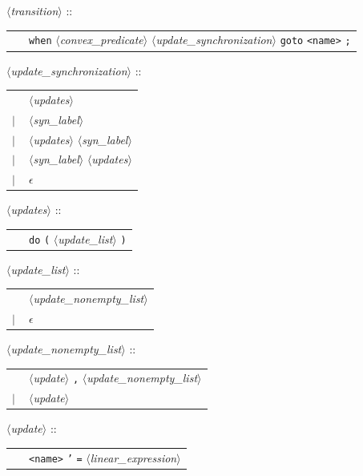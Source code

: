 \documentclass[a4paper,11pt]{report}
\newcommand{\emptystring}{$\epsilon$}
\newcommand{\nt}[1]{$\langle$\emph{#1}$\rangle$}
\newcommand{\regleGrammaire}[1]{\bigskip \noindent \nt{#1} :: \\}
\newcommand{\styleIMI}[1]{\textcolor{imicolor}{\texttt{#1}}}
\begin{document}
\regleGrammaire{transition}
\begin{tabular}{l l}
	\  & \styleIMI{when} \nt{convex\_predicate} \nt{update\_synchronization} \styleIMI{goto} \styleIMI{<name>} \styleIMI{;} \\
\end{tabular}

\regleGrammaire{update\_synchronization}
\begin{tabular}{l l}
	\  & \nt{updates} \\
	$|$ & \nt{syn\_label} \\
	$|$ & \nt{updates} \nt{syn\_label} \\
	$|$ & \nt{syn\_label} \nt{updates} \\
	$|$ & \emptystring \\
\end{tabular}

\regleGrammaire{updates}
\begin{tabular}{l l}
	\  & \styleIMI{do} \styleIMI{(} \nt{update\_list} \styleIMI{)} \\
\end{tabular}

\regleGrammaire{update\_list}
\begin{tabular}{l l}
	\  & \nt{update\_nonempty\_list} \\
	$|$ & \emptystring \\
\end{tabular}

\regleGrammaire{update\_nonempty\_list}
\begin{tabular}{l l}
	\  & \nt{update} \styleIMI{,} \nt{update\_nonempty\_list} \\
	$|$ & \nt{update} \\
\end{tabular}

\regleGrammaire{update}
\begin{tabular}{l l}
	\  & \styleIMI{<name>} \styleIMI{'} \styleIMI{=} \nt{linear\_expression} \\
\end{tabular}
\end{document}
